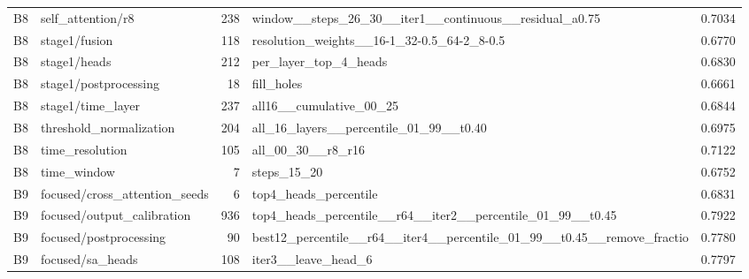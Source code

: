 {\begin{longtable}{>{\raggedright\arraybackslash}p{1.40cm}>{\raggedright\arraybackslash}p{3.67cm}r>{\raggedright\arraybackslash}p{5.74cm}r}
B8 & self\_\allowbreak{}attention/\allowbreak{}r8 & 238 & window\_\allowbreak{}\_\allowbreak{}steps\_\allowbreak{}26\_\allowbreak{}30\_\allowbreak{}\_\allowbreak{}iter1\_\allowbreak{}\_\allowbreak{}continuous\_\allowbreak{}\_\allowbreak{}residual\_\allowbreak{}a0.75 & 0.7034 \\
B8 & stage1/\allowbreak{}fusion & 118 & resolution\_\allowbreak{}weights\_\allowbreak{}\_\allowbreak{}16-1\_\allowbreak{}32-0.5\_\allowbreak{}64-2\_\allowbreak{}8-0.5 & 0.6770 \\
B8 & stage1/\allowbreak{}heads & 212 & per\_\allowbreak{}layer\_\allowbreak{}top\_\allowbreak{}4\_\allowbreak{}heads & 0.6830 \\
B8 & stage1/\allowbreak{}postprocessing & 18 & fill\_\allowbreak{}holes & 0.6661 \\
B8 & stage1/\allowbreak{}time\_\allowbreak{}layer & 237 & all16\_\allowbreak{}\_\allowbreak{}cumulative\_\allowbreak{}00\_\allowbreak{}25 & 0.6844 \\
B8 & threshold\_\allowbreak{}normalization & 204 & all\_\allowbreak{}16\_\allowbreak{}layers\_\allowbreak{}\_\allowbreak{}percentile\_\allowbreak{}01\_\allowbreak{}99\_\allowbreak{}\_\allowbreak{}t0.40 & 0.6975 \\
B8 & time\_\allowbreak{}resolution & 105 & all\_\allowbreak{}00\_\allowbreak{}30\_\allowbreak{}\_\allowbreak{}r8\_\allowbreak{}r16 & 0.7122 \\
B8 & time\_\allowbreak{}window & 7 & steps\_\allowbreak{}15\_\allowbreak{}20 & 0.6752 \\
B9 & focused/\allowbreak{}cross\_\allowbreak{}attention\_\allowbreak{}seeds & 6 & top4\_\allowbreak{}heads\_\allowbreak{}percentile & 0.6831 \\
B9 & focused/\allowbreak{}output\_\allowbreak{}calibration & 936 & top4\_\allowbreak{}heads\_\allowbreak{}percentile\_\allowbreak{}\_\allowbreak{}r64\_\allowbreak{}\_\allowbreak{}iter2\_\allowbreak{}\_\allowbreak{}percentile\_\allowbreak{}01\_\allowbreak{}99\_\allowbreak{}\_\allowbreak{}t0.45 & 0.7922 \\
B9 & focused/\allowbreak{}postprocessing & 90 & best12\_\allowbreak{}percentile\_\allowbreak{}\_\allowbreak{}r64\_\allowbreak{}\_\allowbreak{}iter4\_\allowbreak{}\_\allowbreak{}percentile\_\allowbreak{}01\_\allowbreak{}99\_\allowbreak{}\_\allowbreak{}t0.45\_\allowbreak{}\_\allowbreak{}remove\_\allowbreak{}fractio & 0.7780 \\
B9 & focused/\allowbreak{}sa\_\allowbreak{}heads & 108 & iter3\_\allowbreak{}\_\allowbreak{}leave\_\allowbreak{}head\_\allowbreak{}6 & 0.7797 \\

\end{longtable}}
